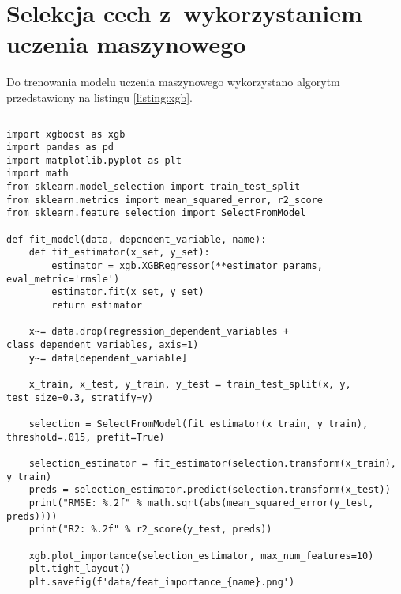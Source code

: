 \section{Selekcja cech z~wykorzystaniem uczenia maszynowego}\label{sec:analysis:feature-selection-xgb}

Do trenowania modelu uczenia maszynowego wykorzystano algorytm przedstawiony na listingu \ref{listing:xgb}.


\noindent\begin{minipage}{\textwidth}
             \begin{lstlisting}[caption={Algorytm uczenia modelu regresji}, label={listing:xgb}]
             \end{lstlisting}
             \hspace{.075\textwidth}\begin{minipage}{.85\textwidth}
                                        \begin{verbatim}
import xgboost as xgb
import pandas as pd
import matplotlib.pyplot as plt
import math
from sklearn.model_selection import train_test_split
from sklearn.metrics import mean_squared_error, r2_score
from sklearn.feature_selection import SelectFromModel

def fit_model(data, dependent_variable, name):
    def fit_estimator(x_set, y_set):
        estimator = xgb.XGBRegressor(**estimator_params, eval_metric='rmsle')
        estimator.fit(x_set, y_set)
        return estimator

    x~= data.drop(regression_dependent_variables + class_dependent_variables, axis=1)
    y~= data[dependent_variable]

    x_train, x_test, y_train, y_test = train_test_split(x, y, test_size=0.3, stratify=y)

    selection = SelectFromModel(fit_estimator(x_train, y_train), threshold=.015, prefit=True)

    selection_estimator = fit_estimator(selection.transform(x_train), y_train)
    preds = selection_estimator.predict(selection.transform(x_test))
    print("RMSE: %.2f" % math.sqrt(abs(mean_squared_error(y_test, preds))))
    print("R2: %.2f" % r2_score(y_test, preds))

    xgb.plot_importance(selection_estimator, max_num_features=10)
    plt.tight_layout()
    plt.savefig(f'data/feat_importance_{name}.png')
                                        \end{verbatim}
             \end{minipage}

             \raggedright\source{\ownwork}
             \vspace{0.75cm}
\end{minipage}

